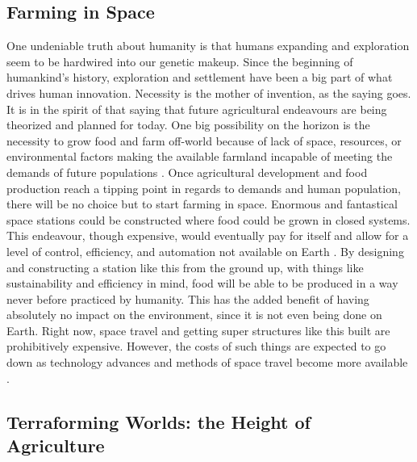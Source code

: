 \documentclass[sigconf]{acmart}
\begin{document}
\subsection{Farming in Space}

One undeniable truth about humanity is that humans expanding and exploration seem to be hardwired into our genetic makeup. Since the beginning of humankind's history, exploration and settlement have been a big part of what drives human innovation. Necessity is the mother of invention, as the saying goes. It is in the spirit of that saying that future agricultural endeavours are being theorized and planned for today. One big possibility on the horizon is the necessity to grow food and farm off-world because of lack of space, resources, or environmental factors making the available farmland incapable of meeting the demands of future populations \cite{purdy2016}. Once agricultural development and food production reach a tipping point in regards to demands and human population, there will be no choice but to start farming in space. Enormous and fantastical space stations could be constructed where food could be grown in closed systems. This endeavour, though expensive, would eventually pay for itself and allow for a level of control, efficiency, and automation not available on Earth \cite{purdy2016}. By designing and constructing a station like this from the ground up, with things like sustainability and efficiency in mind, food will be able to be produced in a way never before practiced by humanity. This has the added benefit of having absolutely no impact on the environment, since it is not even being done on Earth. Right now, space travel and getting super structures like this built are prohibitively expensive. However, the costs of such things are expected to go down as technology advances and methods of space travel become more available \cite{viscio2014}.

\subsection{Terraforming Worlds: the Height of Agriculture}
\end{document}
